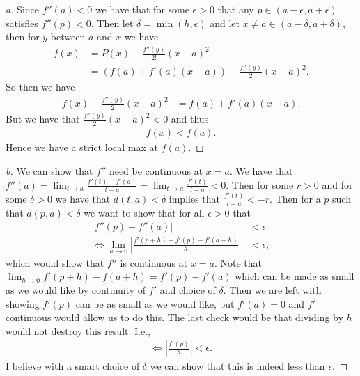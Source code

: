 \documentclass[leqno]{article}
\theoremstyle{nonumberplain}
\newtheorem{proof}{Proof}
\begin{document}
\begin{proof}[a] 
\noindent Since $f''(a)<0$ we have that for some $\epsilon>0$ that any $p\in (a-\epsilon,a+\epsilon)$ satisfies $f''(p)<0$.  Then let $\delta=\min(h,\epsilon)$ and let $x\neq a \in (a-\delta,a+\delta)$, then for $y$ between $a$ and $x$ we have 
\begin{align*}
f(x)&=P(x)+\frac{f''(y)}{2!}(x-a)^2\\
&=(f(a)+f'(a)(x-a))+\frac{f''(y)}{2}(x-a)^2.
\end{align*}
So then we have
\begin{align*}
f(x)-\frac{f''(y)}{2}(x-a)^2&=f(a)+f'(a)(x-a).
\end{align*}
But we have that $\frac{f''(y)}{2}(x-a)^2<0$ and thus
\begin{align*}
f(x)<f(a).
\end{align*}
Hence we have a strict local max at $f(a)$.
\end{proof}

\begin{proof}[b]
We can show that $f''$ need be continuous at $x=a$. We have that $f''(a)=\lim_{t\to a} \frac{f'(t)-f'(a)}{t-a}=\lim_{t\to a}\frac{f'(t)}{t-a}<0$.  Then for some $r >0$ and for some $\delta>0$ we have that $d(t,a)<\delta$ implies that $\frac{f'(t)}{t-a}<-r$. Then for a $p$ such that $d(p,a)<\delta$ we want to show that for all $\epsilon>0$ that
\begin{align*}
|f''(p)-f''(a)|&<\epsilon\\
\iff \lim_{h\to 0} \left| \frac{f'(p+h)-f'(p)-f'(a+h)}{h}\right|&<\epsilon,
\end{align*}
which would show that $f''$ is continuous at $x=a$.  Note that $\lim_{h\to 0} f'(p+h)-f(a+h)=f'(p)-f'(a)$ which can be made as small as we would like by continuity of $f'$ and choice of $\delta$.  Then we are left with showing $f'(p)$ can be as small as we would like, but $f'(a)=0$ and $f'$ continuous would allow us to do this.  The last check would be that dividing by $h$ would not destroy this result. I.e.,
\begin{align*}
\iff \left| \frac{f'(p)}{h} \right|<\epsilon.
\end{align*}
I believe with a smart choice of $\delta$ we can show that this is indeed less than $\epsilon$.  

\end{proof}


\pagebreak
\end{document}
